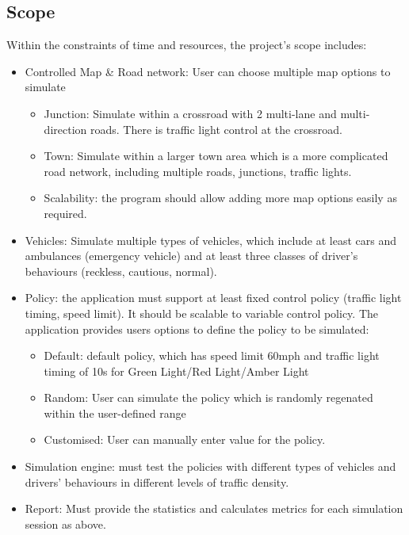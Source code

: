 \documentclass[11pt]{article}
\begin{document}
\subsection{Scope}

Within the constraints of time and resources, the project's scope includes:
\begin{itemize}[noitemsep]
\item Controlled Map \& Road network: User can choose multiple map options to simulate
    \begin{itemize}[noitemsep]
	\item Junction: Simulate within a crossroad with 2 multi-lane and multi-direction roads. There is traffic light control at the crossroad.
	\item Town: Simulate within a larger town area which is a more complicated road network, including multiple roads, junctions, traffic lights. 
	\item Scalability: the program should allow adding more map options easily as required. 
	
	\end{itemize}

\item Vehicles: Simulate multiple types of vehicles, which include at least cars and ambulances (emergency vehicle) and at least three classes of driver’s behaviours (reckless, cautious, normal).

\item Policy: the application must support at least fixed control policy (traffic light timing, speed limit). It should be scalable to variable control policy. The application provides users options to define the policy to be simulated:
    \begin{itemize}
    \item Default: default policy, which has speed limit 60mph and traffic light timing of 10s for Green Light/Red Light/Amber Light
    \item Random: User can simulate the policy which is randomly regenated within the user-defined range
    \item Customised: User can manually enter value for the policy.
    \end{itemize}

\item Simulation engine: must test the policies with different types of vehicles and drivers' behaviours in different levels of traffic density.
\item Report: Must provide the statistics and calculates metrics  for each simulation session as above.
\end{itemize}
\end{document}
